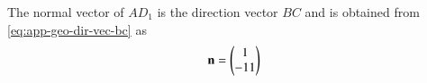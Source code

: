 \solution
The normal vector of $AD_{1}$ 
is
the direction vector $BC$ and is obtained from  
		\eqref{eq:app-geo-dir-vec-bc}
		as
\begin{align}
	\mathbf{n} = 
\begin{pmatrix}1\\-11\end{pmatrix}
\end{align}


